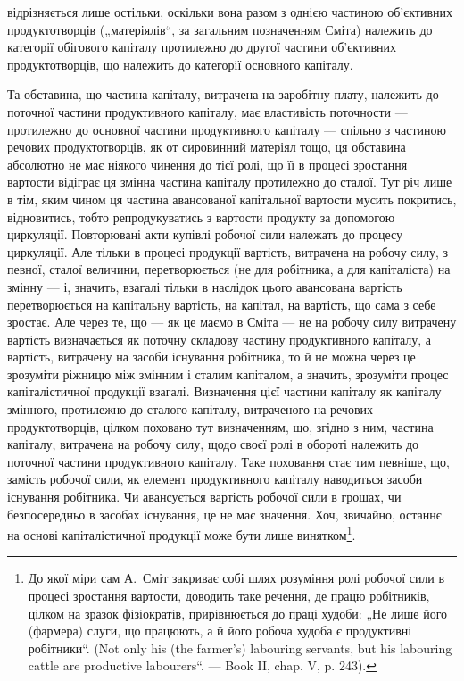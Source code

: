 \parcont{}  %
відрізняється лише остільки, оскільки вона разом з однією частиною об’єктивних
продуктотворців („матеріялів“, за загальним позначенням Сміта)
належить до категорії обігового капіталу протилежно до другої частини
об’єктивних продуктотворців, що належить до категорії основного капіталу.

Та обставина, що частина капіталу, витрачена на заробітну плату, належить
до поточної частини продуктивного капіталу, має властивість поточности
— протилежно до основної частини продуктивного капіталу —
спільно з частиною речових продуктотворців, як от сировинний матеріял
тощо, ця обставина абсолютно не має ніякого чинення до тієї ролі, що
її в процесі зростання вартости відіграє ця змінна частина капіталу протилежно
до сталої. Тут річ лише в тім, яким чином ця частина авансованої
капітальної вартости мусить покритись, відновитись, тобто репродукуватись
з вартости продукту за допомогою циркуляції. Повторювані
акти купівлі робочої сили належать до процесу циркуляції. Але тільки
в процесі продукції вартість, витрачена на робочу силу, з певної, сталої
величини, перетворюється (не для робітника, а для капіталіста) на змінну —
і, значить, взагалі тільки в наслідок цього авансована вартість перетворюється
на капітальну вартість, на капітал, на вартість, що сама з себе
зростає. Але через те, що — як це маємо в Сміта — не на робочу силу
витрачену вартість визначається як поточну складову частину продуктивного
капіталу, а вартість, витрачену на засоби існування робітника, то й
не можна через це зрозуміти ріжницю між змінним і сталим капіталом, а
значить, зрозуміти процес капіталістичної продукції взагалі. Визначення
цієї частини капіталу як капіталу змінного, протилежно до сталого капіталу,
витраченого на речових продуктотворців, цілком поховано тут
визначенням, що, згідно з ним, частина капіталу, витрачена на робочу силу,
щодо своєї ролі в обороті належить до поточної частини продуктивного
капіталу. Таке поховання стає тим певніше, що, замість робочої
сили, як елемент продуктивного капіталу наводиться засоби існування
робітника. Чи авансується вартість робочої сили в грошах, чи безпосередньо
в засобах існування, це не має значення. Хоч, звичайно, останнє
на основі капіталістичної продукції може бути лише винятком\footnote{
До якої міри сам А.~Сміт закриває собі шлях розуміння ролі робочої
сили в процесі зростання вартости, доводить таке речення, де працю робітників,
цілком на зразок фізіократів, прирівнюється до праці худоби: „Не лише його
(фармера) слуги, що працюють, а й його робоча худоба є продуктивні робітники“.
(Not only his (the farmer’s) labouring servants, but his labouring cattle are
productive labourers“. — Book II, chap. V, p. 243).
}.


